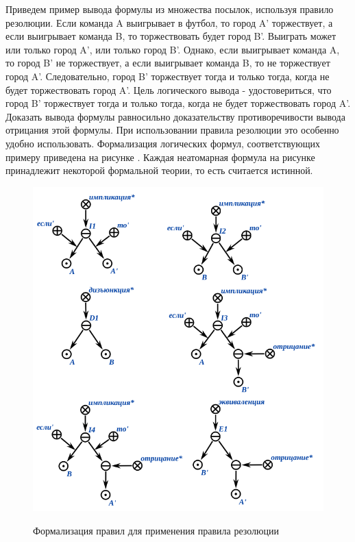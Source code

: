 Приведем пример вывода формулы из множества посылок, используя правило резолюции.
Если команда A выигрывает в футбол, то город A' торжествует, а если выигрывает команда B, то торжествовать будет город B'. Выиграть может или только город A', или только город B'. Однако, если выигрывает команда A, то город B' не торжествует, а если выигрывает команда B, то не торжествует город A'. Следовательно, город B' торжествует тогда и только тогда, когда не будет торжествовать город A'. Цель логического вывода - удостовериться, что город B' торжествует тогда и только тогда, когда не будет торжествовать город A'. Доказать вывода формулы равносильно доказательству противоречивости вывода отрицания этой формулы. При использовании правила резолюции это особенно удобно использовать.
Формализация логических формул, соответствующих примеру приведена на рисунке \textit{}. Каждая неатомарная формула на рисунке принадлежит некоторой формальной теории, то есть считается истинной.

\begin{figure}[H]
	\caption{Формализация правил для применения правила резолюции}
	\includegraphics[scale=0.8]{author/part3/figures/resolution_formulas_example.png}
	\label{fig:resolution_formulas_example}
\end{figure}

